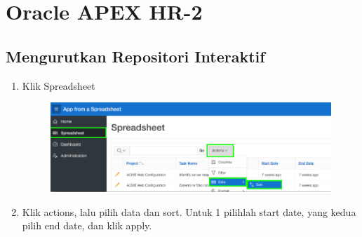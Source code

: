 \chapter{Oracle APEX HR-2}

\section{Mengurutkan Repositori Interaktif}
\begin{enumerate}
    \item{Klik Spreadsheet}
\begin{figure}[!htbp]
    \centering
    \includegraphics[scale=0.5]{section/gambar_bab2/spreadsheet.png}
    \label{penanda}
\end{figure}
    \item{Klik actions, lalu pilih data dan sort. Untuk 1 pilihlah start date, yang kedua pilih end date, dan klik apply.}
\end{enumerate} 


